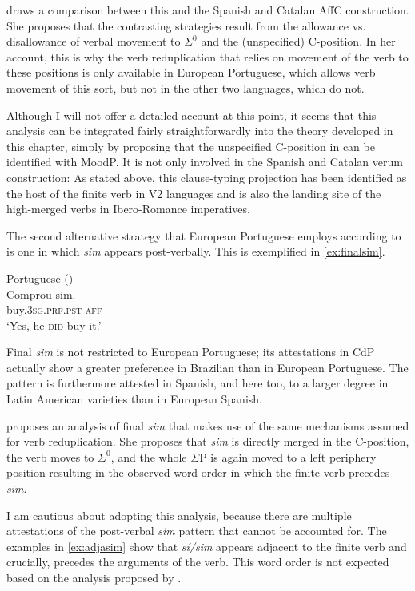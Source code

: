 \citet{Martins2013} draws a comparison between this and the Spanish and Catalan AffC construction. She proposes that the contrasting strategies result from the allowance vs. disallowance of verbal movement to $\Sigma^0$ and the (unspecified) C-position. In her account, this is why the verb reduplication that relies on movement of the verb to these positions is only available in European Portuguese, which allows verb movement of this sort, but not in the other two languages, which do not.
 
Although I will not offer a detailed account at this point, it seems that this analysis can be integrated fairly straightforwardly into the theory developed in this chapter, simply by proposing that the unspecified C-position  in \citet{Martins2013} can be identified with MoodP.  It is not only involved in the Spanish and Catalan verum construction: As stated above, this clause-typing projection has been identified as the host of the finite verb in V2 languages and is also the landing site of the high-merged verbs in Ibero-Romance imperatives. 


The second alternative strategy that European Portuguese employs according to \citet{Martins2013} is one in which \emph{sim} appears post-verbally.   This is exemplified in \eqref{ex:finalsim}.
 
\ea\label{ex:finalsim} Portuguese (\citealt[117: ex 57b]{Martins2013})\\ \gll Comprou sim. \\
 buy.\textsc{3sg.prf.pst} \textsc{aff}\\
 \glt `Yes, he \textsc{did} buy it.' 
 \z
 
Final \emph{sim} is not restricted to European Portuguese; its attestations in CdP actually show a greater preference in Brazilian than in European Portuguese. The pattern is furthermore attested in Spanish, and   here too, to a larger degree in Latin American varieties than in European Spanish.
 
 

\citet{Martins2013} proposes an analysis of final \emph{sim} that makes use of the same mechanisms assumed for verb reduplication. She proposes that \emph{sim} is directly merged in the C-position,  the verb moves to $\Sigma^0$, and the whole $\Sigma$P is again moved to a left periphery   position resulting in the observed word order in which the finite verb precedes \emph{sim}. 


 I am cautious about adopting this analysis,   because there are multiple attestations of the post-verbal \emph{sim} pattern that cannot be accounted for. The examples in \eqref{ex:adjasim} show that \emph{sí/sim} appears adjacent to the finite verb and crucially, precedes the arguments of the verb. This word order is not expected based on the analysis proposed by \citet{Martins2013}.


